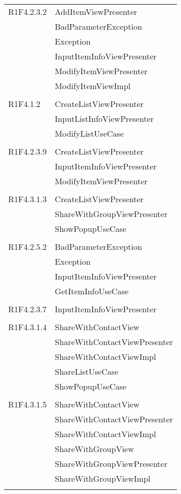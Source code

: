 \begin{center}
\begin{longtable}{|p{7cm}|p{7cm}|}
		R1F4.2.3.2 & AddItemViewPresenter \\ & BadParameterException \\ & Exception \\ & InputItemInfoViewPresenter \\ & ModifyItemViewPresenter \\ & ModifyItemViewImpl \\ & \\ \hline
		R1F4.1.2 & CreateListViewPresenter \\ & InputListInfoViewPresenter \\ & ModifyListUseCase \\ & \\ \hline
		R1F4.2.3.9 & CreateListViewPresenter \\ & InputItemInfoViewPresenter \\ & ModifyItemViewPresenter \\ & \\ \hline
		R1F4.3.1.3 & CreateListViewPresenter \\ & ShareWithGroupViewPresenter \\ & ShowPopupUseCase \\ & \\ \hline
		R1F4.2.5.2 & BadParameterException \\ & Exception \\ & InputItemInfoViewPresenter \\ & GetItemInfoUseCase \\ & \\ \hline
		R1F4.2.3.7 & InputItemInfoViewPresenter \\ & \\ \hline
		R1F4.3.1.4 & ShareWithContactView \\ & ShareWithContactViewPresenter \\ & ShareWithContactViewImpl \\ & ShareListUseCase \\ & ShowPopupUseCase \\ & \\ \hline
		R1F4.3.1.5 & ShareWithContactView \\ & ShareWithContactViewPresenter \\ & ShareWithContactViewImpl \\ & ShareWithGroupView \\ & ShareWithGroupViewPresenter \\ & ShareWithGroupViewImpl \\ & \\ \hline

\end{longtable}
\end{center}
